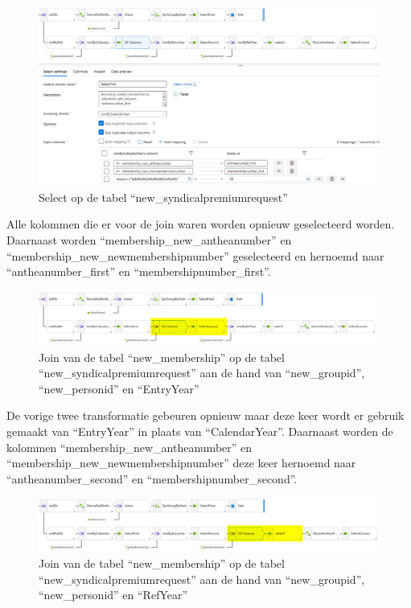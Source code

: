 \begin{figure}[H]
    \centering
    \includegraphics[width=1\textwidth]{./graphics/adf/member_4.png}
    \caption{Select op de tabel ``new\_syndicalpremiumrequest''}
\end{figure}

Alle kolommen die er voor de join waren worden opnieuw geselecteerd worden. Daarnaast worden ``membership\_new\_antheanumber'' en ``membership\_new\_newmembershipnumber'' geselecteerd en hernoemd naar ``antheanumber\_first'' en ``membershipnumber\_first''.

\begin{figure}[H]
    \centering
    \includegraphics[width=1\textwidth]{./graphics/adf/member_5.png}
    \caption{Join van de tabel ``new\_membership'' op de tabel ``new\_syndicalpremiumrequest'' aan de hand van ``new\_groupid'', ``new\_personid'' en ``EntryYear''}
\end{figure}

De vorige twee transformatie gebeuren opnieuw maar deze keer wordt er gebruik gemaakt van ``EntryYear'' in plaats van ``CalendarYear''. Daarnaast worden de kolommen ``membership\_new\_antheanumber'' en ``membership\_new\_newmembershipnumber'' deze keer hernoemd naar ``antheanumber\_second'' en ``membershipnumber\_second''.

\begin{figure}[H]
    \centering
    \includegraphics[width=1\textwidth]{./graphics/adf/member_6.png}
    \caption{Join van de tabel ``new\_membership'' op de tabel ``new\_syndicalpremiumrequest'' aan de hand van ``new\_groupid'', ``new\_personid'' en ``RefYear''}
\end{figure}

